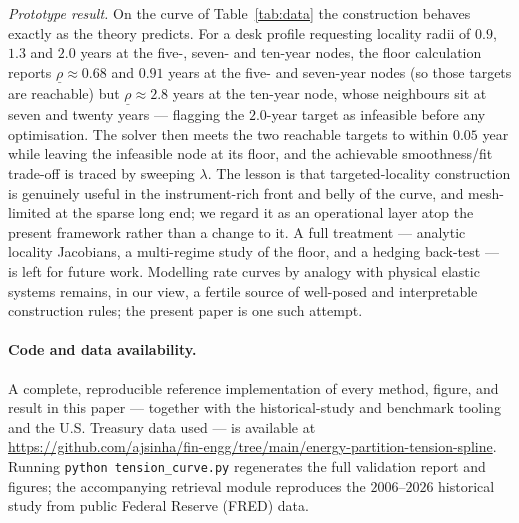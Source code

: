 \documentclass[10pt]{article}
\begin{document}
\emph{Prototype result.} On the curve of Table~\ref{tab:data} the construction behaves exactly as
the theory predicts. For a desk profile requesting locality radii of $0.9$, $1.3$ and $2.0$ years
at the five-, seven- and ten-year nodes, the floor calculation reports $\underline{\rho}\approx
0.68$ and $0.91$ years at the five- and seven-year nodes (so those targets are reachable) but
$\underline{\rho}\approx 2.8$ years at the ten-year node, whose neighbours sit at seven and twenty
years --- flagging the $2.0$-year target as infeasible before any optimisation. The solver then
meets the two reachable targets to within $0.05$ year while leaving the infeasible node at its
floor, and the achievable smoothness/fit trade-off is traced by sweeping $\lambda$. The lesson is
that targeted-locality construction is genuinely useful in the instrument-rich front and belly of
the curve, and mesh-limited at the sparse long end; we regard it as an operational layer atop the
present framework rather than a change to it. A full treatment --- analytic locality Jacobians, a
multi-regime study of the floor, and a hedging back-test --- is left for future work. Modelling
rate curves by analogy with
physical elastic systems remains, in our view, a fertile source of well-posed and
interpretable construction rules; the present paper is one such attempt.

\paragraph{Code and data availability.} A complete, reproducible reference implementation of every
method, figure, and result in this paper --- together with the historical-study and benchmark
tooling and the U.S. Treasury data used --- is available at
\url{https://github.com/ajsinha/fin-engg/tree/main/energy-partition-tension-spline}.
Running \texttt{python tension\_curve.py} regenerates the full validation report and figures; the
accompanying retrieval module reproduces the $2006$--$2026$ historical study from public Federal
Reserve (FRED) data.

\appendix
\end{document}
